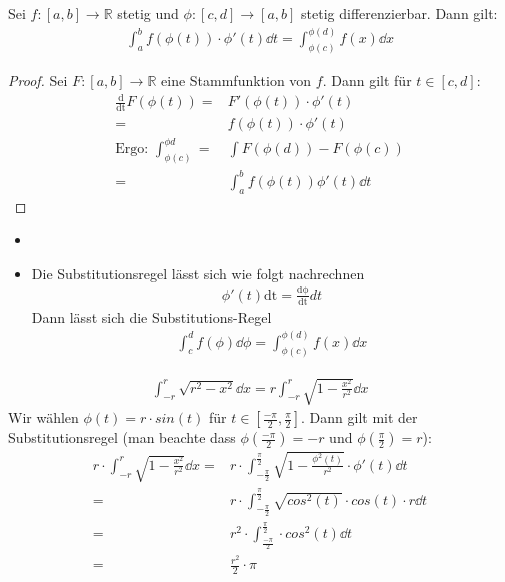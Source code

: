 \begin{Satz}{\label{vl_12_satz_04}
	Sei $f: [a,b] \rightarrow \mathbb{R}$ stetig und $\phi: [c,d] \rightarrow [a,b]$ 
	stetig differenzierbar. Dann gilt:
	\begin{align*}
		\int_a^b f(\phi(t))\cdot\phi'(t)\dd{t} = \int_{\phi(c)}^{\phi(d)} 
		f(x) \dd{x}
	\end{align*}	 
}\end{Satz}


\begin{proof}
	Sei $F : [a,b] \rightarrow \mathbb{R}$ eine Stammfunktion von $f$. Dann gilt für 
	$t \in [c,d]$:
	\begin{align*}
		\frac{\mathrm{d}}{\mathrm{dt}}F(\phi(t)) = &  F'(\phi(t)) \cdot \phi'(t) \\
		= & f(\phi(t))\cdot \phi'(t) \\
		\text{Ergo: } \int_{\phi(c)}^{\phi{d}} = & \int F(\phi(d))-F(\phi(c)) \\
		= & \int_a^b f(\phi(t)) \phi'(t) \dd{t}
	\end{align*}
\end{proof}

\begin{Bemerkung}{
	\begin{itemize}
		\item[ ]
		\item Die Substitutionsregel lässt sich wie folgt nachrechnen
		\begin{align*}
			\phi'(t)\mathrm{dt} = \frac{\mathrm{d\phi}}{\mathrm{dt}}dt
		\end{align*}
		Dann lässt sich die Substitutions-Regel
		\begin{align*}
			\int_c^d f(\phi) \dd{\phi} = \int_{\phi(c)}^{\phi(d)} f(x) \dd{x}
		\end{align*}
	\end{itemize}
}\end{Bemerkung}

\begin{Beispiel}{
	\begin{align*}
		\int_{-r}^r \sqrt{r^2 -x^2} \dd{x} = r \int_{-r}^r 
		\sqrt{1 - \frac{x^2}{r^2}} \dd{x}
	\end{align*}
	Wir wählen $\phi(t) = r \cdot sin(t)$ für $ t \in [\frac{-\pi}{2}, \frac{\pi}{2}]$. 
	Dann gilt mit der Substitutionsregel 
	(man beachte dass $\phi(\frac{-\pi}{2}) = -r 
	$ und $\phi(\frac{\pi}{2}) = r$):
	\begin{align*}
		r \cdot \int_{-r}^r \sqrt{1 - \frac{x^2}{r^2}} \dd{x} = & r 
			\cdot \int_{-\frac{\pi}{2}}^{\frac{\pi}{2}} 
			\sqrt{1 - \frac{\phi^2(t)}{r^2}} \cdot \phi'(t) \dd{t} \\
		= & r \cdot \int_{-\frac{\pi}{2}}^{\frac{\pi}{2}} 
			\sqrt{cos^2(t)} \cdot cos(t) \cdot r\dd{t} \\
		= & r^2 \cdot \int_{\frac{-\pi}{2}}^{\frac{\pi}{2}} \cdot cos^2(t)\dd{t} \\
		= & \frac{r^2}{2} \cdot \pi
	\end{align*}	 
}\end{Beispiel}

